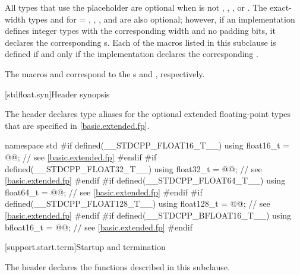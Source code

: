 
\pnum
All types that use the placeholder 
are optional when 
is not , , , or .
The exact-width types
 and 
for  = , , , and 
are also optional;
however, if an implementation defines integer types
with the corresponding width and no padding bits,
it declares the corresponding s.
Each of the macros listed in this subclause
is defined if and only if
the implementation declares the corresponding .
\begin{note}
The macros  and 
correspond to the s
 and ,
respectively.
\end{note}

[stdfloat.syn]{Header  synopsis}

\pnum
The header  declares type aliases for
the optional extended floating-point types that are specified in
\ref{basic.extended.fp}.

%
%
%
%
%
%
\begin{codeblock}
namespace std {
  #if defined(__STDCPP_FLOAT16_T__)
    using float16_t  = @@;  // see \ref{basic.extended.fp}
  #endif
  #if defined(__STDCPP_FLOAT32_T__)
    using float32_t  = @@;  // see \ref{basic.extended.fp}
  #endif
  #if defined(__STDCPP_FLOAT64_T__)
    using float64_t  = @@;  // see \ref{basic.extended.fp}
  #endif
  #if defined(__STDCPP_FLOAT128_T__)
    using float128_t = @@; // see \ref{basic.extended.fp}
  #endif
  #if defined(__STDCPP_BFLOAT16_T__)
    using bfloat16_t = @@; // see \ref{basic.extended.fp}
  #endif
}
\end{codeblock}

[support.start.term]{Startup and termination}

\pnum
\begin{note}
The header 
declares the functions described in this subclause.
\end{note}

